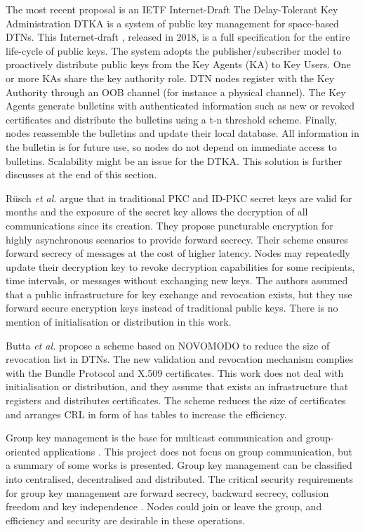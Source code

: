 The most recent proposal is an IETF Internet-Draft  The Delay-Tolerant Key Administration DTKA is a system of public key management for space-based DTNs. This Internet-draft \cite{burleigh-dtnwg-dtka-01}, released in 2018, is a full specification for the entire life-cycle of public keys. The system adopts the publisher/subscriber model to proactively distribute public keys from the Key Agents (KA) to Key Users. One or more KAs share the key authority role. DTN nodes register with the Key Authority through an OOB channel (for instance a physical channel). The Key Agents generate bulletins with authenticated information such as new or revoked certificates and distribute the bulletins using a t-n threshold scheme. Finally, nodes reassemble the bulletins and update their local database. All information in the bulletin is for future use, so nodes do not depend on immediate access to bulletins. Scalability might be an issue for the DTKA. This solution is further discusses at the end of this section.  

R\"{u}sch \textit{et al.}  \cite{rusch2017forward} argue that in traditional PKC and ID-PKC secret keys are valid for months and the exposure of the secret key allows the decryption of all communications since its creation. They propose puncturable encryption for highly asynchronous scenarios to provide forward secrecy. Their scheme ensures forward secrecy of messages at the cost of higher latency. Nodes may repeatedly update their decryption key to revoke decryption capabilities for some recipients, time intervals, or messages without exchanging new keys.  The authors assumed that a public infrastructure for key exchange and revocation exists,  but they use forward secure encryption keys instead of traditional public keys. There is no mention of initialisation or distribution in this work.



Butta \textit{et al.} propose a scheme based on NOVOMODO \cite{micali2008efficient} to reduce the size of revocation list in DTNs. The new validation and revocation mechanism complies with the Bundle Protocol and X.509 certificates. This work does not deal with initialisation or distribution, and they assume that exists an infrastructure that registers and distributes certificates. The scheme reduces the size of certificates and arranges CRL in form of has tables to increase the efficiency.



Group key management is the base for multicast communication and group-oriented applications \cite{jiang2008survey}. This project does not focus on group communication, but a summary of some works is presented. Group key management can be classified into centralised, decentralised and distributed. The critical security requirements for group key management are forward secrecy, backward secrecy, collusion freedom and key independence \cite{camtepe2005key}. Nodes could join or leave the group, and efficiency and security are desirable in these operations.


